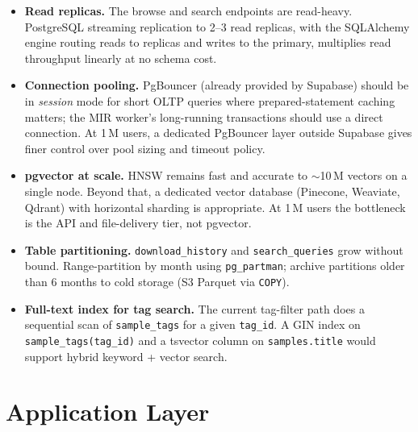 \documentclass[12pt,letterpaper]{report}
\begin{document}
\begin{itemize}
  \item \textbf{Read replicas.} The browse and search endpoints are read-heavy. PostgreSQL streaming replication to 2--3 read replicas, with the SQLAlchemy engine routing reads to replicas and writes to the primary, multiplies read throughput linearly at no schema cost.
  \item \textbf{Connection pooling.} PgBouncer (already provided by Supabase) should be in \textit{session} mode for short OLTP queries where prepared-statement caching matters; the MIR worker's long-running transactions should use a direct connection. At 1\,M users, a dedicated PgBouncer layer outside Supabase gives finer control over pool sizing and timeout policy.
  \item \textbf{pgvector at scale.} HNSW remains fast and accurate to $\sim$10\,M vectors on a single node. Beyond that, a dedicated vector database (Pinecone, Weaviate, Qdrant) with horizontal sharding is appropriate. At 1\,M users the bottleneck is the API and file-delivery tier, not pgvector.
  \item \textbf{Table partitioning.} \texttt{download\_history} and \texttt{search\_queries} grow without bound. Range-partition by month using \texttt{pg\_partman}; archive partitions older than 6 months to cold storage (S3 Parquet via \texttt{COPY}).
  \item \textbf{Full-text index for tag search.} The current tag-filter path does a sequential scan of \texttt{sample\_tags} for a given \texttt{tag\_id}. A GIN index on \texttt{sample\_tags(tag\_id)} and a tsvector column on \texttt{samples.title} would support hybrid keyword + vector search.
\end{itemize}

\section{Application Layer}
\end{document}
